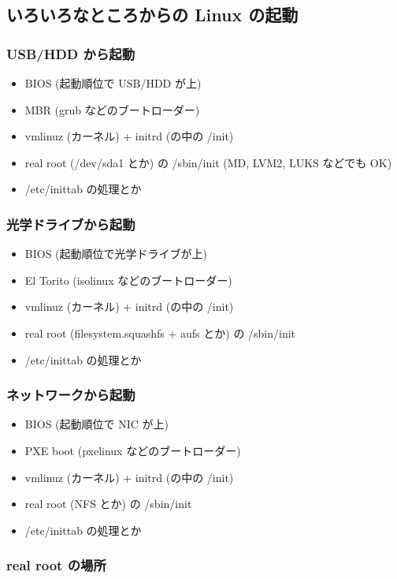 \documentclass[mingoth,a4paper]{jsarticle}
\begin{document}
\subsection{いろいろなところからの Linux の起動}

\subsubsection{USB/HDD から起動}

\begin{itemize}
\item BIOS (起動順位で USB/HDD が上)
\item MBR (grub などのブートローダー)
\item vmlinuz (カーネル) + initrd (の中の /init)
\item real root (/dev/sda1 とか) の /sbin/init
    (MD, LVM2, LUKS などでも OK)
\item /etc/inittab の処理とか
\end{itemize}
\subsubsection{光学ドライブから起動}

\begin{itemize}
\item BIOS (起動順位で光学ドライブが上)
\item El Torito (isolinux などのブートローダー)
\item vmlinuz (カーネル) + initrd (の中の /init)
\item real root (filesystem.squashfs + aufs とか) の /sbin/init
\item /etc/inittab の処理とか
\end{itemize}
\subsubsection{ネットワークから起動}

\begin{itemize}
\item BIOS (起動順位で NIC が上)
\item PXE boot (pxelinux などのブートローダー)
\item vmlinuz (カーネル) + initrd (の中の /init)
\item real root (NFS とか) の /sbin/init
\item /etc/inittab の処理とか
\end{itemize}
\subsubsection{real root の場所}
\end{document}
